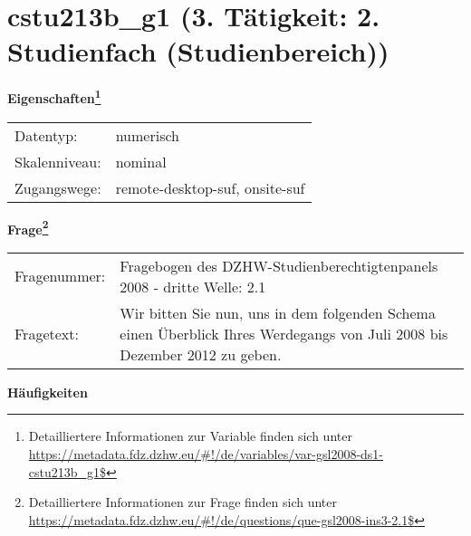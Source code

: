 
    \setcounter{footnote}{0}

    \vspace*{-1.8cm}
	\section{cstu213b\_g1 (3. Tätigkeit: 2. Studienfach (Studienbereich))}
	\label{section:cstu213b_g1}



    \vspace*{0.5cm}
    \noindent\textbf{Eigenschaften\footnote{Detailliertere Informationen zur Variable finden sich unter
		\url{https://metadata.fdz.dzhw.eu/\#!/de/variables/var-gsl2008-ds1-cstu213b_g1$}}}\\
	\begin{tabularx}{\hsize}{@{}lX}
	Datentyp: & numerisch \\
	Skalenniveau: & nominal \\
	Zugangswege: &
	  remote-desktop-suf, 
	  onsite-suf
 \\
    \end{tabularx}



				\vspace*{0.5cm}
                \noindent\textbf{Frage\footnote{Detailliertere Informationen zur Frage finden sich unter
		              \url{https://metadata.fdz.dzhw.eu/\#!/de/questions/que-gsl2008-ins3-2.1$}}}\\
				\begin{tabularx}{\hsize}{@{}lX}
					Fragenummer: &
					  Fragebogen des DZHW-Studienberechtigtenpanels 2008 - dritte Welle:
					  2.1
 \\
					Fragetext: & Wir bitten Sie nun, uns in dem folgenden Schema einen Überblick Ihres Werdegangs von Juli 2008 bis Dezember 2012 zu geben. \\
				\end{tabularx}





        		\vspace*{0.5cm}
                \noindent\textbf{Häufigkeiten}

